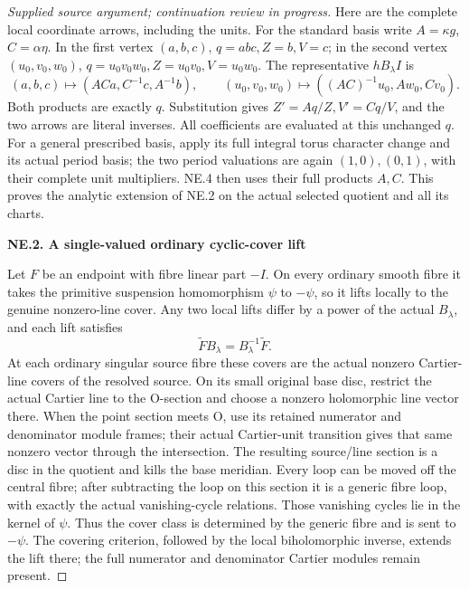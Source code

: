 \begin{proof}[Supplied source argument; continuation review in progress]
Here are the complete local coordinate arrows, including the units.
For the standard basis write
\(A=\kappa g\), \(C=\alpha\eta\). In the first vertex
\((a,b,c)\), \(q=abc,Z=b,V=c\); in the second vertex
\((u_0,v_0,w_0)\), \(q=u_0v_0w_0,Z=u_0v_0,V=u_0w_0\).
The representative \(hB_\lambda I\) is
\[
 (a,b,c)\longmapsto(ACa,C^{-1}c,A^{-1}b),\qquad
 (u_0,v_0,w_0)\longmapsto((AC)^{-1}u_0,Aw_0,Cv_0).
 \tag{NE.4}
\]
Both products are exactly \(q\). Substitution gives
\(Z'=Aq/Z,V'=Cq/V\), and the two arrows are literal inverses.
All coefficients are evaluated at this unchanged \(q\). For a
general prescribed basis, apply its full integral torus character
change and its actual period basis; the two period valuations are
again \((1,0),(0,1)\), with their complete unit multipliers. NE.4
then uses their full products \(A,C\). This proves the analytic
extension of NE.2 on the actual selected quotient and all its charts.

\par

\medskip\noindent\textbf{NE.2. A single-valued ordinary cyclic-cover lift}

\par\nobreak

Let \(F\) be an endpoint with fibre linear part \(-I\). On every
ordinary smooth fibre it takes the primitive suspension homomorphism
\(\psi\) to \(-\psi\), so it lifts locally to the genuine nonzero-line
cover. Any two local lifts differ by a power of the actual
\(B_\lambda\), and each lift satisfies
\[
                   \widetilde F B_\lambda
                        =B_\lambda^{-1}\widetilde F.
 \tag{NE.5}
\]
At each ordinary singular source fibre these covers are the actual
nonzero Cartier-line covers of the resolved source. On its small
original base disc, restrict the actual Cartier line to the O-section
and choose a nonzero holomorphic line vector there. When the point
section meets O, use its retained numerator and denominator module
frames; their actual Cartier-unit transition gives that same nonzero
vector through the intersection. The resulting source/line section
is a disc in the quotient and kills the base meridian. Every loop can
be moved off the central fibre; after subtracting the loop on this
section it is a generic fibre loop, with exactly the actual
vanishing-cycle relations. Those vanishing cycles lie in the kernel
of \(\psi\). Thus the cover class is determined by the generic fibre
and is sent to \(-\psi\). The covering criterion, followed by the
local biholomorphic inverse, extends the lift there; the full
numerator and denominator Cartier modules remain present.


\end{proof}
